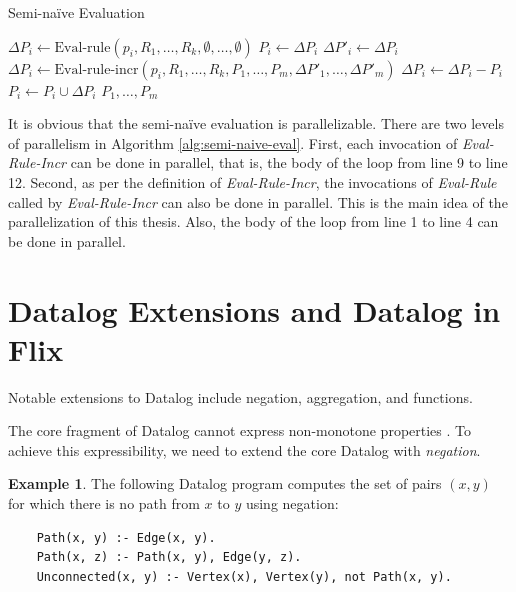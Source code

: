 \documentclass[11pt]{report}
\theoremstyle{definition}
\newtheorem{exmp}{Example}[chapter]
\begin{document}
\begin{algorithm}
  \caption{Semi-naïve Evaluation}
  \begin{algorithmic}[1]
    \State $\Delta P_i \leftarrow \text{Eval-rule}(p_i, R_1, \ldots, R_k, \emptyset, \ldots, \emptyset)$
    \State $P_i \leftarrow \Delta P_i$
    \EndFor
    \Repeat
    \State $\Delta P'_i \leftarrow \Delta P_i$
    \EndFor
    \State $\Delta P_i \leftarrow \text{Eval-rule-incr}(p_i, R_1, \ldots, R_k, P_1, \ldots, P_m, \Delta P'_1, \ldots, \Delta P'_m)$
    \State $\Delta P_i \leftarrow \Delta P_i - P_i$
    \EndFor
    \State $P_i \leftarrow P_i \cup \Delta P_i$
    \EndFor
    \State \Return $P_1, \ldots, P_m$
  \end{algorithmic}
\end{algorithm}
\label{alg:semi-naive-eval}

It is obvious that the semi-naïve evaluation is parallelizable. There are two levels of parallelism in Algorithm \ref{alg:semi-naive-eval}. First, each invocation of \textit{Eval-Rule-Incr} can be done in parallel, that is, the body of the loop from line 9 to line 12. Second, as per the definition of \textit{Eval-Rule-Incr}, the invocations of \textit{Eval-Rule} called by \textit{Eval-Rule-Incr} can also be done in parallel. This is the main idea of the parallelization of this thesis. Also, the body of the loop from line 1 to line 4 can be done in parallel.

\section{Datalog Extensions and Datalog in Flix}

Notable extensions to Datalog include negation, aggregation, and functions.

The core fragment of Datalog cannot express non-monotone properties \cite{AFRATI1995177}. To achieve this expressibility, we need to extend the core Datalog with \textit{negation}.

\begin{exmp}
  The following Datalog program computes the set of pairs $(x, y)$ for which there is no path from $x$ to $y$ using negation:

  \begin{verbatim}
    Path(x, y) :- Edge(x, y).
    Path(x, z) :- Path(x, y), Edge(y, z).
    Unconnected(x, y) :- Vertex(x), Vertex(y), not Path(x, y).
  \end{verbatim}
\end{exmp}
\end{document}
